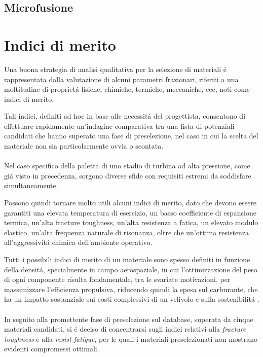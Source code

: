 \documentclass{article}
\begin{document}
            \clearpage

        \subsection{Microfusione\label{Casting_microfusione}}



        \clearpage


    \section{Indici di merito\label{material_index}}

        Una buona strategia di analisi qualitativa per la selezione di materiali é rappresentata dalla valutazione di alcuni parametri frazionari, riferiti a una moltitudine di proprietá fisiche, chimiche, termiche, meccaniche, ecc, noti come indici di merito.
        
        Tali indici, definiti ad hoc in base alle necessitá del progettista, consentono di effettuare rapidamente un’indagine comparativa tra una lista di potenziali candidati che hanno superato una fase di preselezione, nel caso in cui la scelta del materiale non sia particolarmente ovvia o scontata. 
        \\ \\
        Nel caso specifico della paletta di uno stadio di turbina ad alta pressione, come giá visto in precedenza, sorgono diverse sfide con requisiti estremi da soddisfare simultaneamente.

        Possono quindi tornare molto utili alcuni indici di merito, dato che devono essere garantiti una elevata temperatura di esercizio, un basso coefficiente di espansione termica, un’alta fracture toughness, un’alta resistenza a fatica, un elevato modulo elastico, un’alta frequenza naturale di risonanza, oltre che un’ottima resistenza all’aggressivitá chimica dell’ambiente operativo. 
        
        Tutti i possibili indici di merito di un materiale sono spesso definiti in funzione della densitá, specialmente in campo aerospaziale, in cui l’ottimizzazione del peso di ogni componente risulta fondamentale, tra le svariate motivazioni, per massimizzare l’efficienza propulsiva, riducendo quindi la spesa sul carburante, che ha un impatto sostanziale sui costi complessivi di un velivolo e sulla sostenibilitá \autocite{EASA_environ_report_2019}.
        \\ \\ 
        In seguito alla promettente fase di preselezione sul database,
        superata da cinque materiali candidati, si é deciso di concentrarsi sugli indici relativi alla \textit{fracture toughness} e alla \textit{resist fatigue},
        per le quali i materiali preselezionati non mostrano evidenti compromessi ottimali.
\end{document}
